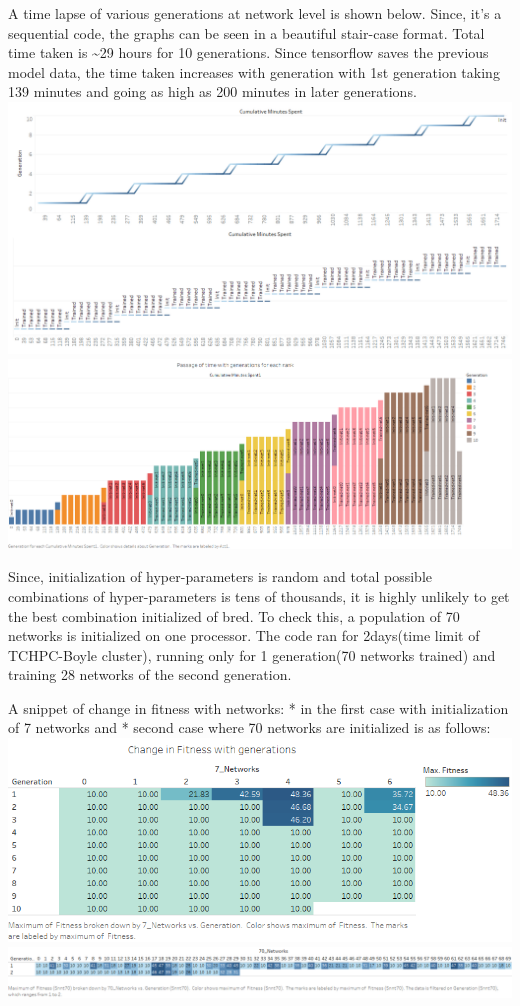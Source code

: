 \documentclass[]{article}
\begin{document}
A time lapse of various generations at network level is shown below.
Since, it's a sequential code, the graphs can be seen in a beautiful
stair-case format. Total time taken is \textasciitilde{}29 hours for 10
generations. Since tensorflow saves the previous model data, the time
taken increases with generation with 1st generation taking 139 minutes
and going as high as 200 minutes in later generations.
\includegraphics{./Images/TimeDashboard.png}
\includegraphics{./Images/PassageTime.png}

Since, initialization of hyper-parameters is random and total possible
combinations of hyper-parameters is tens of thousands, it is highly
unlikely to get the best combination initialized of bred. To check this,
a population of 70 networks is initialized on one processor. The code
ran for 2days(time limit of TCHPC-Boyle cluster), running only for 1
generation(70 networks trained) and training 28 networks of the second
generation.

A snippet of change in fitness with networks: * in the first case with
initialization of 7 networks and * second case where 70 networks are
initialized is as follows: \includegraphics{./Images/7Ranks.png}
\includegraphics{./Images/70Ranks.png}
\end{document}
